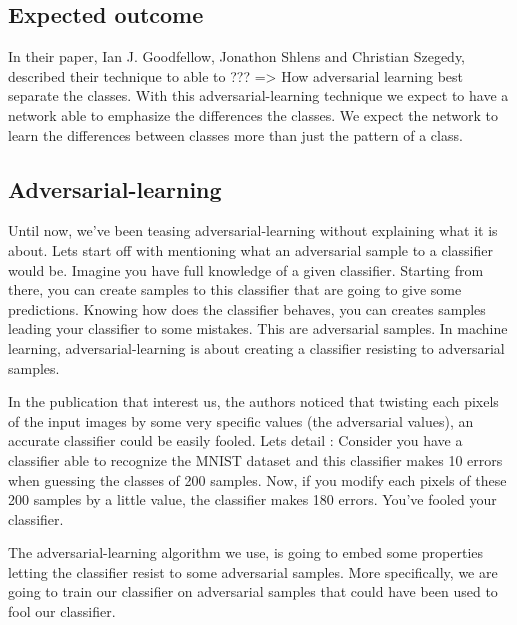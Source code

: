 	\subsection{Expected outcome}
		In their paper, Ian J. Goodfellow, Jonathon Shlens and Christian Szegedy, described their technique to able to ??? 
		=> How adversarial learning best separate the classes.
		With this adversarial-learning technique we expect to have a network able to emphasize the differences the classes. We expect the network to learn the differences between classes more than just the pattern of a class.


	\subsection{Adversarial-learning}
		Until now, we've been teasing adversarial-learning without explaining what it is about. Lets start off with mentioning what an adversarial sample to a classifier would be. Imagine you have full knowledge of a given classifier. Starting from there, you can create samples to this classifier that are going to give some predictions. Knowing how does the classifier behaves, you can creates samples leading your classifier to some mistakes. This are adversarial samples. In machine learning, adversarial-learning is about creating a classifier resisting to adversarial samples.

		In the publication that interest us\cite{goodfellow2014explaining}, the authors noticed that twisting each pixels of the input images by some very specific values (the adversarial values), an accurate classifier could be easily fooled. Lets detail : Consider you have a classifier able to recognize the MNIST dataset and this classifier makes 10 errors when guessing the classes of 200 samples. Now, if you modify each pixels of these 200 samples by a little value, the classifier makes 180 errors. You've fooled your classifier. 

		The adversarial-learning algorithm we use, is going to embed some properties letting the classifier resist to some adversarial samples. More specifically, we are going to train our classifier on adversarial samples that could have been used to fool our classifier.



